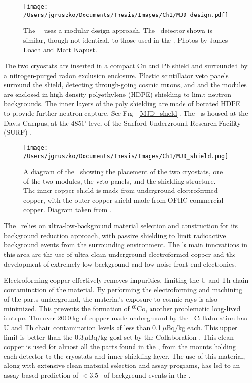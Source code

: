 \begin{figure}[t]
\centering
\texttt{[image: /Users/jgruszko/Documents/Thesis/Images/Ch1/MJD\_design.pdf]}
\caption[The modular elements of the \DEM\ design]{The \MJ\ \DEM\ uses a modular design approach. The \ppc\ detector shown is similar, though not identical, to those used in the \DEM. Photos by James Loach and Matt Kapust.}
\label{fig:MJ_modular}
\end{figure}

The two cryostats are inserted in a compact Cu and Pb shield and surrounded by a nitrogen-purged radon exclusion enclosure. Plastic scintillator veto panels surround the shield, detecting through-going cosmic muons, and and the modules are enclosed in high density polyethylene (HDPE) shielding to limit neutron backgrounds. The inner layers of the poly shielding are made of borated HDPE to provide further neutron capture. See Fig.~\ref{MJD_shield}. The \DEM\ is housed at the Davis Campus, at the 4850' level of the Sanford Underground Research Facility (SURF) \cite{MJD2014}. 

\begin{figure}[t]
\centering
\texttt{[image: /Users/jgruszko/Documents/Thesis/Images/Ch1/MJD\_shield.png]}
\caption[A diagram of the \DEM\ shielding configuration]{A diagram of the \DEM\ showing the placement of the two cryostats, one of the two modules, the veto panels, and the shielding structure. The inner copper shield is made from underground electroformed copper, with the outer copper shield made from OFHC commercial copper. Diagram taken from \cite{MJD2014}.}
\label{fig:MJ_modular}
\end{figure}

The \DEM\ relies on ultra-low-background material selection and construction for its background reduction approach, with passive shielding to limit radioactive background events from the surrounding environment. The \DEM's main innovations in this area are the use of ultra-clean underground electroformed copper and the development of extremely low-background and low-noise front-end electronics. 

Electroforming copper effectively removes impurities, limiting the U and Th chain contamination of the material. By performing the electroforming and machining of the parts underground, the material's exposure to cosmic rays is also minimized. This prevents the formation of $^{60}$Co, another problematic long-lived isotope. The over-2000\,kg of copper made underground by the \MJ\ Collaboration has U and Th chain contamination levels of less than 0.1\,$\mu$Bq/kg each. This upper limit is better than the 0.3\,$\mu$Bq/kg goal set by the Collaboration \cite{MJD_assay}. This clean copper is used for almost all the parts found in the \DEM, from the mounts holding each detector to the cryostats and inner shielding layer. The use of this material, along with extensive clean material selection and assay programs, has led to an assay-based prediction of $< 3.5$ \cpRty\ of background events in the \DEM \cite{MJD_assay}. 


